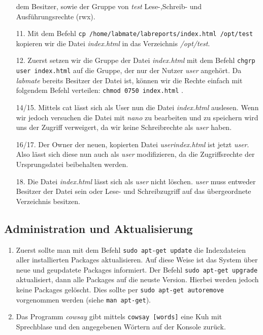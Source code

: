 \documentclass{scrartcl}
\begin{document}
\begin{enumerate}[1.]
            dem Besitzer, sowie der Gruppe von \textit{test} Lese-,Schreib- und
            Ausführungsrechte (rwx).
      \item[11.] Mit dem Befehl \texttt{cp /home/labmate/labreports/index.html /opt/test}
            kopieren wir die Datei \textit{index.html} in das Verzeichnis \textit{/opt/test}.
      \item[12.] Zuerst setzen wir die Gruppe der Datei \textit{index.html} mit dem Befehl
            \texttt{chgrp user index.html} auf die Gruppe, der nur der Nutzer
            \textit{user} angehört. Da \textit{labmate} bereits Besitzer der Datei
            ist, können wir die Rechte einfach mit folgendem Befehl verteilen:
            \texttt{chmod 0750 index.html} .
      \item[14/15.] Mittels cat lässt sich als User nun die Datei \textit{index.html}
            auslesen. Wenn wir jedoch versuchen die Datei mit \textit{nano} zu
            bearbeiten und zu speichern wird uns der Zugriff verweigert, da wir
            keine Schreibrechte als \textit{user} haben.
      \item[16/17.] Der Owner der neuen, kopierten Datei \textit{userindex.html}
            ist jetzt \textit{user}. Also lässt sich diese nun auch als \textit{user}
            modifizieren, da die Zugriffsrechte der Ursprungsdatei beibehalten werden.
      \item[18.] Die Datei \textit{index.html} lässt sich als \textit{user} nicht
            löschen. \textit{user} muss entweder Besitzer der Datei sein oder
            Lese- und Schreibzugriff auf das übergeordnete Verzeichnis besitzen.
    \end{enumerate}

    \subsection{Administration und Aktualisierung}
    \label{sub:Administration und Aktualisierung}

    \begin{enumerate} [1.]
      \item Zuerst sollte man mit dem Befehl \texttt{sudo apt-get update} die
            Indexdateien aller installierten Packages aktualisieren. Auf diese
            Weise ist das System über neue und geupdatete Packages informiert.
            Der Befehl \texttt{sudo apt-get upgrade} aktualisiert, dann alle
            Packages auf die neuste Version. Hierbei werden jedoch keine Packages
            gelöscht. Dies sollte per \texttt{sudo apt-get autoremove} vorgenommen
            werden (siehe \texttt{man apt-get}).
      \item Das Programm \textit{cowsay} gibt mittels \texttt{cowsay [words]} eine
            Kuh mit Sprechblase und den angegebenen Wörtern auf der Konsole zurück.
    \end{enumerate}
\end{document}
